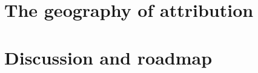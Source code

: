 \documentclass[12pt]{article}
\begin{document}
\section{The geography of attribution}

\section{Discussion and roadmap}

\appendix
\end{document}
